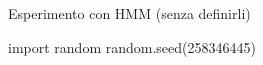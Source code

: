 \documentclass[11pt,twoside,a4paper]{article}
\newcounter{quesito}
\newenvironment{question}{\bigskip\addtocounter{quesito}{1}\bigskip\bigskip\par\textbf{Quesito \thequesito.\kern0ex}}{\par\vspace{\parskip}}
\begin{document}
\colorbox{blue!10}{\begin{minipage}{\textwidth}
Esperimento con HMM (senza definirli)

\end{minipage}}

\bigskip\bigskip


\begin{pycode}
import random
random.seed(258346445)
\end{pycode}


% 
% 
% 
% 
% 
%  
\end{document}
